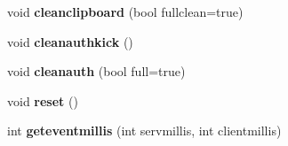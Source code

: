 \begin{DoxyCompactItemize}
void {\bfseries cleanclipboard} (bool fullclean=true)
\item 
\mbox{\label{structserver_1_1clientinfo_ae385924a6d99e68bd6b4550c50713b12}} 
void {\bfseries cleanauthkick} ()
\item 
\mbox{\label{structserver_1_1clientinfo_a83892c395c493c8fe9a931e0a0b0440c}} 
void {\bfseries cleanauth} (bool full=true)
\item 
\mbox{\label{structserver_1_1clientinfo_a0c423be136e2ca972f4b13b053c0823d}} 
void {\bfseries reset} ()
\item 
\mbox{\label{structserver_1_1clientinfo_a33ed0f9aab1ca3a28738b760fd68f583}} 
int {\bfseries geteventmillis} (int servmillis, int clientmillis)
\end{DoxyCompactItemize}
